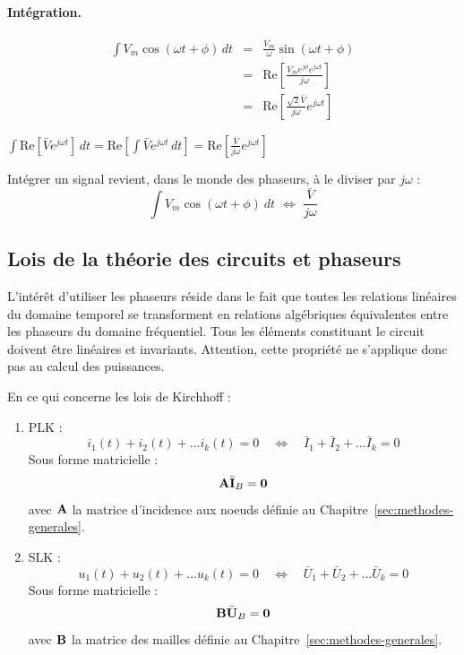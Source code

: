 \paragraph{Intégration.} %
\begin{eqnarray*}
	\int V_m\cos(\omega t+\phi)\, dt& = &
	\frac{V_m}{\omega}\sin(\omega t+\phi)\\
	& = &\text{Re}[\frac{V_me^{j\phi}e^{j\omega t}}{j \omega}]\\
	& = & \text{Re}[\frac{\sqrt{2}\bar{V}}{j \omega}e^{j\omega t}]
\end{eqnarray*}
\begin{center}
	$\int \text{Re}[\bar{V}e^{j\omega t}]\, dt =
		\text{Re}[\int \bar{V}e^{j\omega t}\, dt]=
		\text{Re}[\frac{\bar{V}}{j\omega} e^{j\omega t}]$
\end{center}
\begin{table}[h]
	\caption{Intégration.}
	\begin{boxedminipage}{\linewidth}
		Intégrer un signal revient, dans le monde des phaseurs, à le diviser par $j\omega$ :
		\[\int V_m\cos(\omega t+\phi)\ dt\,\,\Leftrightarrow\,\,
		\frac{\bar{V}}{j\omega}\]		
	\end{boxedminipage}
\end{table}




\subsection{Lois de la théorie des circuits et phaseurs}
L'intérêt d'utiliser les phaseurs réside dans le fait que toutes les relations linéaires du domaine temporel se transforment en relations algébriques équivalentes entre les phaseurs du domaine fréquentiel.
Tous les éléments constituant le circuit doivent être linéaires et
invariants.
Attention, cette propriété ne s'applique donc pas au calcul des puissances. 

En ce qui concerne les lois de Kirchhoff :
\begin{enumerate}
\item PLK : 
		\[ i_1(t)+i_2(t)+\ldots i_k(t) =0 \quad \Leftrightarrow \quad
		\bar{I}_1+ \bar{I}_2+\ldots \bar{I}_k=0\]
		Sous forme matricielle :
		\[{\bf A}\bar{\bf I}_B={\bf 0}\]
		avec ${\bf A}$ la matrice d'incidence aux noeuds définie au Chapitre~\ref{sec:methodes-generales}.
\item SLK :
		\[ u_1(t)+u_2(t)+\ldots u_k(t) =0 \quad \Leftrightarrow \quad
		\bar{U}_1+ \bar{U}_2+\ldots \bar{U}_k=0\]
		Sous forme matricielle :
		\[{\bf B}\bar{\bf U}_B={\bf 0}\]
		avec ${\bf B}$ la matrice des mailles définie au Chapitre~\ref{sec:methodes-generales}.
\end{enumerate}

